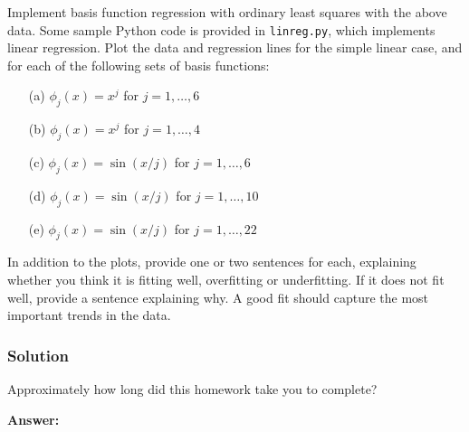 \documentclass[submit]{harvardml}
\begin{document}
	\begin{problem}
		Implement basis function regression with ordinary least squares with the above
		data. Some sample Python code is provided in \verb|linreg.py|, which implements
		linear regression.  Plot the data and regression lines for the simple linear
		case, and for each of the following sets of basis functions:
		\begin{itemize}
			\item[(a)] $\phi_j(x) = x^j$ for $j=1, \ldots, 6$
			\item[(b)] $\phi_j(x) = x^j$ for $j=1, \ldots, 4$
			\item[(c)] $\phi_j(x) = \sin(x / j)$ for $j=1, \ldots, 6$
			\item[(d)] $\phi_j(x) = \sin(x / j)$ for $j=1, \ldots, 10$
			\item[(e)] $\phi_j(x) = \sin(x / j)$ for $j=1, \ldots, 22$
		\end{itemize}
		In addition to the plots, provide one or two sentences for each, explaining
		whether you think it is fitting well, overfitting or underfitting.  If it does
		not fit well, provide a sentence explaining why. A good fit should capture the
		most important trends in the data.
	\end{problem}
	
	\subsubsection*{Solution}
	
	
	
	
	
	
	
	
	
	
	
	\newpage
	\begin{problem}[Calibration, 1pt]
		Approximately how long did this homework take you to complete?
	\end{problem}
	\textbf{Answer:}
	
\end{document}

